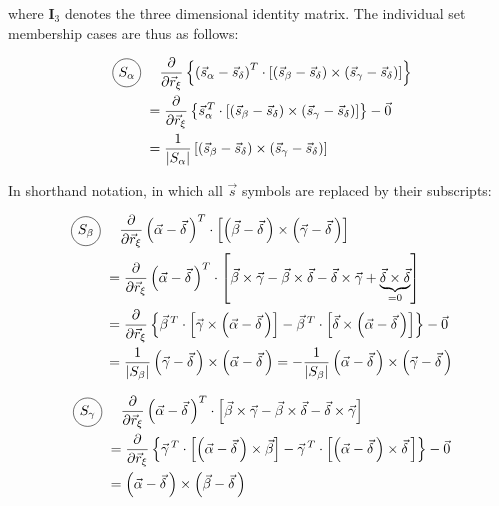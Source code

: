 \documentclass[a4paper]{article}
\newcommand*\circled[1]{
  \tikz[baseline=(char.base)]{
    \node[shape=circle,draw,inner sep=2pt] (char) {#1};
  }
}
\begin{document}
where $\mathbf{I}_3$ denotes the three dimensional identity matrix. The individual set
membership cases are thus as follows:

\begin{align}
  \text{\circled{$S_\alpha$}} &\quad \partialPosVec{\xi} \left\{ 
    \avgVecDiff{\alpha}{\delta}^{T}
    \cdot \left[
      \avgVecDiff{\beta}{\delta}
      \times \avgVecDiff{\gamma}{\delta}
    \right]
  \right\} \\
  &= \partialPosVec{\xi} \left\{ 
    \vec{s}_\alpha^{\,T}
    \cdot \left[
      \avgVecDiff{\beta}{\delta}
      \times \avgVecDiff{\gamma}{\delta}
    \right]
  \right\} - \vec{0} \\
  &= \frac{1}{|S_\alpha|} \left[
    \avgVecDiff{\beta}{\delta} \times \avgVecDiff{\gamma}{\delta} 
  \right]
\end{align}

In shorthand notation, in which all $\vec{s}$ symbols are replaced by their subscripts:

\begin{align}
  \text{\circled{$S_\beta$}} &\quad \partialPosVec{\xi} 
    \vecDiff{\alpha}{\delta}^{T}
    \cdot \left[
      \vecDiff{\beta}{\delta}
      \times \vecDiff{\gamma}{\delta}
    \right] \\
  &= \partialPosVec{\xi}
    \vecDiff{\alpha}{\delta}^{T}
    \cdot \left[
      \vec{\beta} \times \vec{\gamma} - \vec{\beta} \times \vec{\delta} - \vec{\delta} \times \vec{\gamma} + \underbrace{
        \vec{\delta} \times \vec{\delta}
      }_{=0}
    \right] \\
  &= \partialPosVec{\xi} \left\{
    \vec{\beta}^{\,T} \cdot \left[
      \vec{\gamma} \times \vecDiff{\alpha}{\delta}
    \right] 
    - \vec{\beta}^{\,T} \cdot \left[
      \vec{\delta} \times \vecDiff{\alpha}{\delta}
    \right] 
  \right\} - \vec{0} \\
&= \frac{1}{|S_\beta|} \vecDiff{\gamma}{\delta} \times \vecDiff{\alpha}{\delta} 
  = - \frac{1}{|S_\beta|}\vecDiff{\alpha}{\delta} \times \vecDiff{\gamma}{\delta}
\end{align}

\begin{align}
  \text{\circled{$S_\gamma$}} &\quad \partialPosVec{\xi} 
    \vecDiff{\alpha}{\delta}^{T}
    \cdot \left[
      \vec{\beta} \times \vec{\gamma} - \vec{\beta} \times \vec{\delta} - \vec{\delta} \times \vec{\gamma} 
    \right] \\
  &= \partialPosVec{\xi} \left\{
    \vec{\gamma}^{\,T} \cdot \left[
      \vecDiff{\alpha}{\delta} \times \vec{\beta}
    \right] 
    - \vec{\gamma}^{\,T} \cdot \left[
      \vecDiff{\alpha}{\delta} \times \vec{\delta}\,
    \right] 
  \right\} - \vec{0} \\
  &= \vecDiff{\alpha}{\delta} \times \vecDiff{\beta}{\delta} 
\end{align}
\end{document}
